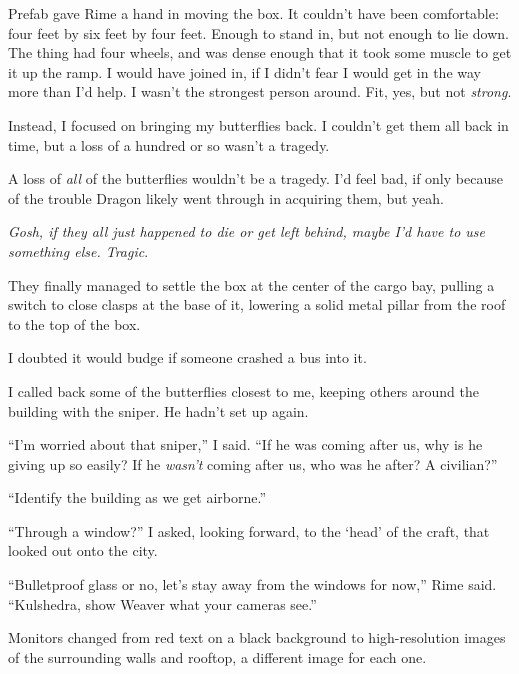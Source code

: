 Prefab gave Rime a hand in moving the box.  It couldn't have been comfortable: four feet by six feet by four feet.  Enough to stand in, but not enough to lie down.  The thing had four wheels, and was dense enough that it took some muscle to get it up the ramp.  I would have joined in, if I didn't fear I would get in the way more than I'd help.  I wasn't the strongest person around.  Fit, yes, but not \emph{strong}.



Instead, I focused on bringing my butterflies back.  I couldn't get them all back in time, but a loss of a hundred or so wasn't a tragedy.



A loss of \emph{all} of the butterflies wouldn't be a tragedy.  I'd feel bad, if only because of the trouble Dragon likely went through in acquiring them, but yeah.



\emph{Gosh, if they all just happened to die or get left behind, maybe I'd have to use something else.  Tragic}.



They finally managed to settle the box at the center of the cargo bay, pulling a switch to close clasps at the base of it, lowering a solid metal pillar from the roof to the top of the box.



I doubted it would budge if someone crashed a bus into it.



I called back some of the butterflies closest to me, keeping others around the building with the sniper.  He hadn't set up again.



``I'm worried about that sniper,'' I said.  ``If he was coming after us, why is he giving up so easily?  If he \emph{wasn't} coming after us, who was he after?  A civilian?''



``Identify the building as we get airborne.''



``Through a window?'' I asked, looking forward, to the `head' of the craft, that looked out onto the city.



``Bulletproof glass or no, let's stay away from the windows for now,'' Rime said.  ``Kulshedra, show Weaver what your cameras see.''



Monitors changed from red text on a black background to high-resolution images of the surrounding walls and rooftop, a different image for each one.



